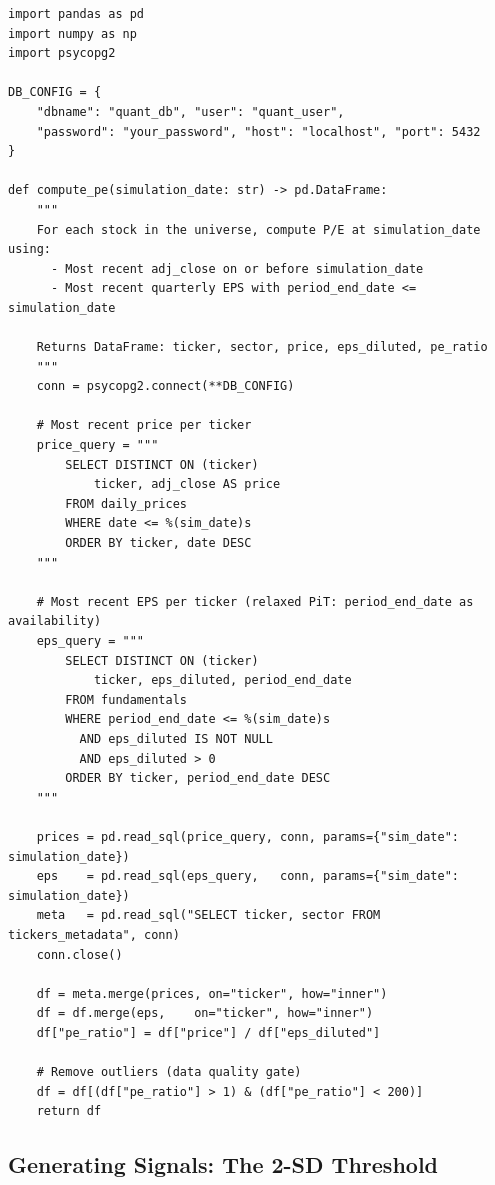 \documentclass[11pt, oneside]{book}
\begin{document}
\begin{lstlisting}[style=pythonstyle, caption={P/E Ratio Calculation (Relaxed PiT)}]
import pandas as pd
import numpy as np
import psycopg2

DB_CONFIG = {
    "dbname": "quant_db", "user": "quant_user",
    "password": "your_password", "host": "localhost", "port": 5432
}

def compute_pe(simulation_date: str) -> pd.DataFrame:
    """
    For each stock in the universe, compute P/E at simulation_date using:
      - Most recent adj_close on or before simulation_date
      - Most recent quarterly EPS with period_end_date <= simulation_date

    Returns DataFrame: ticker, sector, price, eps_diluted, pe_ratio
    """
    conn = psycopg2.connect(**DB_CONFIG)

    # Most recent price per ticker
    price_query = """
        SELECT DISTINCT ON (ticker)
            ticker, adj_close AS price
        FROM daily_prices
        WHERE date <= %(sim_date)s
        ORDER BY ticker, date DESC
    """

    # Most recent EPS per ticker (relaxed PiT: period_end_date as availability)
    eps_query = """
        SELECT DISTINCT ON (ticker)
            ticker, eps_diluted, period_end_date
        FROM fundamentals
        WHERE period_end_date <= %(sim_date)s
          AND eps_diluted IS NOT NULL
          AND eps_diluted > 0
        ORDER BY ticker, period_end_date DESC
    """

    prices = pd.read_sql(price_query, conn, params={"sim_date": simulation_date})
    eps    = pd.read_sql(eps_query,   conn, params={"sim_date": simulation_date})
    meta   = pd.read_sql("SELECT ticker, sector FROM tickers_metadata", conn)
    conn.close()

    df = meta.merge(prices, on="ticker", how="inner")
    df = df.merge(eps,    on="ticker", how="inner")
    df["pe_ratio"] = df["price"] / df["eps_diluted"]

    # Remove outliers (data quality gate)
    df = df[(df["pe_ratio"] > 1) & (df["pe_ratio"] < 200)]
    return df
\end{lstlisting}

\subsection{Generating Signals: The 2-SD Threshold}
\end{document}

